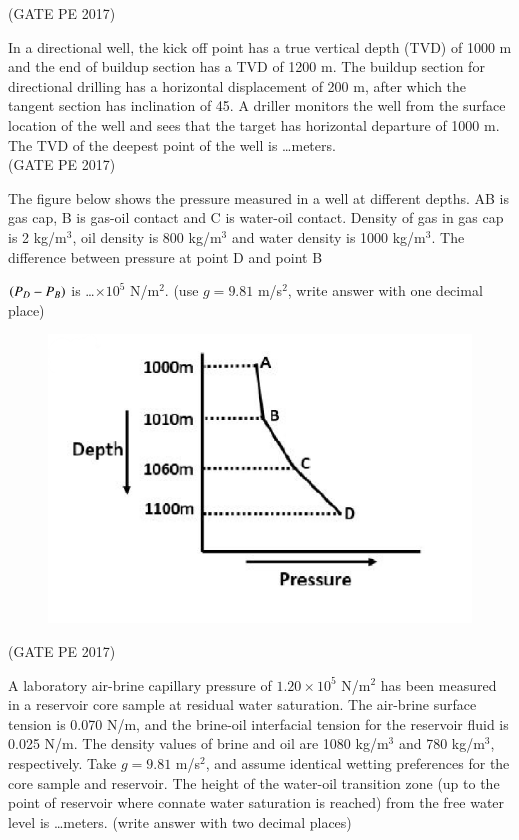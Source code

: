 \documentclass[journal,12pt,onecolumn]{IEEEtran}
\theoremstyle{remark}
\begin{document}
\begin{enumerate}
\hfill{(GATE PE 2017)}

\item In a directional well, the kick off point has a true vertical depth (TVD) of 1000 m and the end of buildup section has a TVD of 1200 m. The buildup section for directional drilling has a horizontal displacement of 200 m, after which the tangent section has inclination of 45\degree.
A driller monitors the well from the surface location of the well and sees that the target has horizontal departure of 1000 m. The TVD of the deepest point of the well is \dots meters.\\

\hfill{(GATE PE 2017)}

\item The figure below shows the pressure measured in a well at different depths. AB is gas cap, B is gas-oil contact and C is water-oil contact. Density of gas in gas cap is 2 kg/m$^3$, oil density is 800 kg/m$^3$ and water density is 1000 kg/m$^3$.
The difference between pressure at point D and point B {$\left(P_D - P_B\right)$ is \dots $\times 10^5$ N/m$^2$. (use $g = 9.81$ m/s$^2$, write answer with one decimal place)\\
\begin{figure}[h]
    \centering
    \includegraphics[width=0.5\columnwidth]{GraphQ _33.png}
\end{figure}
\hfill{(GATE PE 2017)}
\item A laboratory air-brine capillary pressure of $1.20 \times 10^5$ N/m$^2$ has been measured in a reservoir core sample at residual water saturation. The air-brine surface tension is 0.070 N/m, and the brine-oil interfacial tension for the reservoir fluid is 0.025 N/m. The density values of brine and oil are 1080 kg/m$^3$ and 780 kg/m$^3$, respectively.
Take $g = 9.81$ m/s$^2$, and assume identical wetting preferences for the core sample and reservoir. The height of the water-oil transition zone (up to the point of reservoir where connate water saturation is reached) from the free water level is \dots meters. (write answer with two decimal places)\\

}
\end{enumerate}
\end{document}
